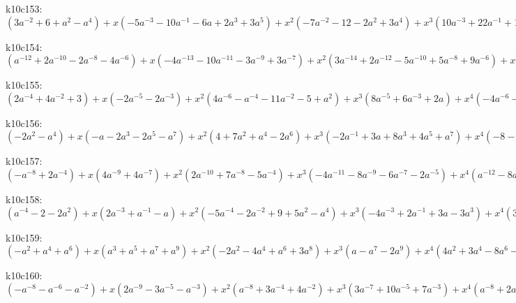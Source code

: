 k10c153: $ (3a^{-2}+6+a^{2}-a^{4}) +x(-5a^{-3}-10a^{-1}-6a+2a^{3}+3a^{5}) +x^{2}(-7a^{-2}-12-2a^{2}+3a^{4}) +x^{3}(10a^{-3}+22a^{-1}+12a-4a^{3}-4a^{5}) +x^{4}(10a^{-2}+14-4a^{4}) +x^{5}(-6a^{-3}-13a^{-1}-7a+a^{3}+a^{5}) +x^{6}(-6a^{-2}-7+a^{4}) +x^{7}(a^{-3}+2a^{-1}+a) +x^{8}(a^{-2}+1) $

k10c154: $ (a^{-12}+2a^{-10}-2a^{-8}-4a^{-6}) +x(-4a^{-13}-10a^{-11}-3a^{-9}+3a^{-7}) +x^{2}(3a^{-14}+2a^{-12}-5a^{-10}+5a^{-8}+9a^{-6}) +x^{3}(10a^{-13}+21a^{-11}+9a^{-9}-2a^{-7}) +x^{4}(-4a^{-14}-a^{-12}+7a^{-10}-2a^{-8}-6a^{-6}) +x^{5}(-9a^{-13}-15a^{-11}-6a^{-9}) +x^{6}(a^{-14}-3a^{-12}-5a^{-10}+a^{-6}) +x^{7}(2a^{-13}+3a^{-11}+a^{-9}) +x^{8}(a^{-12}+a^{-10}) $

k10c155: $ (2a^{-4}+4a^{-2}+3) +x(-2a^{-5}-2a^{-3}) +x^{2}(4a^{-6}-a^{-4}-11a^{-2}-5+a^{2}) +x^{3}(8a^{-5}+6a^{-3}+2a) +x^{4}(-4a^{-6}-a^{-4}+7a^{-2}+4) +x^{5}(-8a^{-5}-9a^{-3}-a^{-1}) +x^{6}(a^{-6}-2a^{-4}-3a^{-2}) +x^{7}(2a^{-5}+3a^{-3}+a^{-1}) +x^{8}(a^{-4}+a^{-2}) $

k10c156: $ (-2a^{2}-a^{4}) +x(-a-2a^{3}-2a^{5}-a^{7}) +x^{2}(4+7a^{2}+a^{4}-2a^{6}) +x^{3}(-2a^{-1}+3a+8a^{3}+4a^{5}+a^{7}) +x^{4}(-8-9a^{2}+2a^{4}+3a^{6}) +x^{5}(a^{-1}-7a-9a^{3}-a^{5}) +x^{6}(3+2a^{2}-a^{4}) +x^{7}(3a+4a^{3}+a^{5}) +x^{8}(a^{2}+a^{4}) $

k10c157: $ (-a^{-8}+2a^{-4}) +x(4a^{-9}+4a^{-7}) +x^{2}(2a^{-10}+7a^{-8}-5a^{-4}) +x^{3}(-4a^{-11}-8a^{-9}-6a^{-7}-2a^{-5}) +x^{4}(a^{-12}-8a^{-10}-15a^{-8}-3a^{-6}+3a^{-4}) +x^{5}(4a^{-11}-3a^{-7}+a^{-5}) +x^{6}(6a^{-10}+8a^{-8}+2a^{-6}) +x^{7}(4a^{-9}+5a^{-7}+a^{-5}) +x^{8}(a^{-8}+a^{-6}) $

k10c158: $ (a^{-4}-2-2a^{2}) +x(2a^{-3}+a^{-1}-a) +x^{2}(-5a^{-4}-2a^{-2}+9+5a^{2}-a^{4}) +x^{3}(-4a^{-3}+2a^{-1}+3a-3a^{3}) +x^{4}(3a^{-4}-a^{-2}-13-8a^{2}+a^{4}) +x^{5}(a^{-3}-7a^{-1}-5a+3a^{3}) +x^{6}(a^{-2}+6+5a^{2}) +x^{7}(a^{-3}+5a^{-1}+4a) +x^{8}(a^{-2}+1) $

k10c159: $ (-a^{2}+a^{4}+a^{6}) +x(a^{3}+a^{5}+a^{7}+a^{9}) +x^{2}(-2a^{2}-4a^{4}+a^{6}+3a^{8}) +x^{3}(a-a^{7}-2a^{9}) +x^{4}(4a^{2}+3a^{4}-8a^{6}-7a^{8}) +x^{5}(a^{3}-5a^{5}-5a^{7}+a^{9}) +x^{6}(3a^{6}+3a^{8}) +x^{7}(a^{3}+4a^{5}+3a^{7}) +x^{8}(a^{4}+a^{6}) $

k10c160: $ (-a^{-8}-a^{-6}-a^{-2}) +x(2a^{-9}-3a^{-5}-a^{-3}) +x^{2}(a^{-8}+3a^{-4}+4a^{-2}) +x^{3}(3a^{-7}+10a^{-5}+7a^{-3}) +x^{4}(a^{-8}+2a^{-6}-3a^{-4}-4a^{-2}) +x^{5}(-3a^{-7}-11a^{-5}-8a^{-3}) +x^{6}(-3a^{-6}-2a^{-4}+a^{-2}) +x^{7}(a^{-7}+3a^{-5}+2a^{-3}) +x^{8}(a^{-6}+a^{-4}) $

